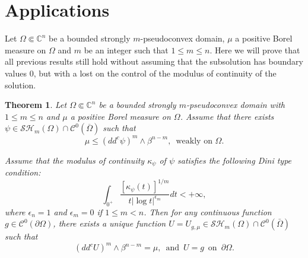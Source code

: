 \documentclass[12pt]{amsart}
\newtheorem{theorem}{Theorem}
\theoremstyle{definition}
\numberwithin{theorem}{section}
\numberwithin{equation}{section}
\newcommand{\C}{\mathbb{C}}
\begin{document}
{  %
 
  
\section{Applications}


Let $\Omega \Subset \C^n$ be a  bounded strongly $m$-pseudoconvex  domain,  $\mu $ a positive Borel measure on $\Omega$  and $m$ be an integer such that  $1 \leq  m \leq n$. Here we will prove that all previous results still hold without assuming that the subsolution has boundary values $0$, but with a lost on the control of the modulus of continuity of the solution.


\begin{theorem} \label{thm:general} Let $\Omega \Subset \C^n$ be a  bounded strongly $m$-pseudoconvex  domain  with $1 \leq  m \leq n$ and $\mu $ a positive Borel measure on $\Omega$. Assume that there exists $\psi\in \mathcal{SH}_m(\Omega)\cap\mathcal{C}^{0}(\overline\Omega)$ such that  
\begin{equation} \label{eq:subsol2}
 \mu \leq (dd^c\psi)^m\wedge\beta^{n-m}, \, \, \, \mathrm{weakly \, \, on} \, \,  \Omega.
\end{equation} 

Assume that the modulus of continuity $\kappa_\psi$ of $\psi$ satisfies the following Dini type condition:
 \begin{equation} \label{eq:DC0}
 \int_{0^+} \frac{\left[\kappa_\psi (t)\right]^{1 \slash m}}{t \vert \log t\vert^{\epsilon_m} } d t< + \infty, 
 \end{equation}
 where $\epsilon_n = 1$ and $\epsilon_m = 0$ if $1 \leq m < n$.
 Then for any continuous function $g \in \mathcal{C}^{0} (\partial \Omega)$, there exists a unique function $U = U_{g,\mu} \in \mathcal{SH}_m (\Omega) \cap \mathcal{C}^{0} (\bar{\Omega})$ such that  
 $$
 (dd^c U)^m\wedge\beta^{n-m} = \mu, \, \, \, \mathrm{and} \, \, \, U = g \, \, \, \mathrm{on} \, \, \,  \partial \Omega.
 $$
 

\end{theorem}}
\end{document}
